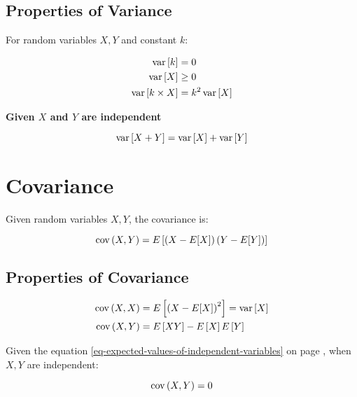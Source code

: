   \subsection{Properties of Variance}

    For random variables $ X, Y $ and constant $ k $:

    \begin{align}
      \operatorname{var} \left[ k \right] &= 0 \\
      \operatorname{var} \left[ X \right] &\geq 0 \\
      \operatorname{var} \left[ k \times X \right] &= k^{2} \operatorname{var} \left[ X \right]
    \end{align}

    \textbf{Given $ X $ and $ Y $ are independent}

    \begin{equation}
      \operatorname{var} \left[ X + Y \right] = \operatorname{var} \left[ X \right] + \operatorname{var} \left[ Y \right]
    \end{equation}

\section{Covariance}

  Given random variables $ X, Y $, the covariance is:

  \begin{equation}
    \operatorname{cov} \left( X, Y \right) = E \left[ \left( X - E[X] \right) \left( Y - E[Y] \right) \right]
  \end{equation}

  \subsection{Properties of Covariance}

    \begin{align}
      \operatorname{cov} \left( X, X \right) &= E \left[ \left( X - E[X] \right)^{2} \right] = \operatorname{var} \left[ X \right] \\
      \operatorname{cov} \left( X, Y \right) &= E \left[ XY \right] - E \left[ X \right] E \left[ Y \right] \\
    \end{align}

    Given the equation \ref{eq-expected-values-of-independent-variables} on page \pageref{eq-expected-values-of-independent-variables}, when $ X, Y $ are independent:

    \begin{equation}
      \operatorname{cov} \left( X, Y \right) = 0
    \end{equation}

